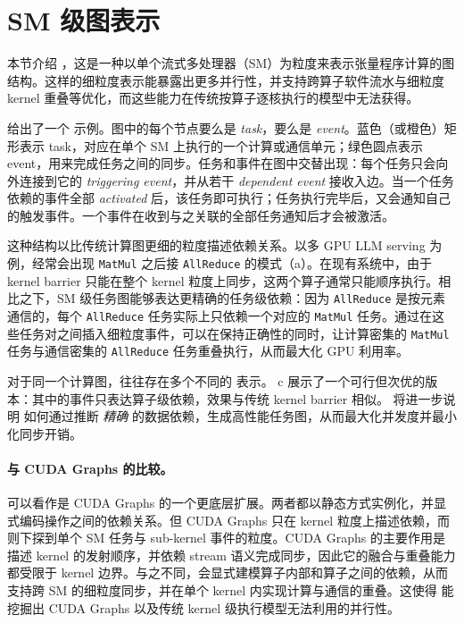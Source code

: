 \section{SM 级图表示}
\label{sec:task_graph}

本节介绍 {\em \graph}，这是一种以单个流式多处理器（SM）为粒度来表示张量程序计算的图结构。这样的细粒度表示能暴露出更多并行性，并支持跨算子软件流水与细粒度 kernel 重叠等优化，而这些能力在传统按算子逐核执行的模型中无法获得。

 给出了一个 \graph 示例。图中的每个节点要么是 {\em task}，要么是 {\em event}。蓝色（或橙色）矩形表示 task，对应在单个 SM 上执行的一个计算或通信单元；绿色圆点表示 event，用来完成任务之间的同步。任务和事件在图中交替出现：每个任务只会向外连接到它的 {\em triggering event}，并从若干 {\em dependent event} 接收入边。当一个任务依赖的事件全部 {\em activated} 后，该任务即可执行；任务执行完毕后，又会通知自己的触发事件。一个事件在收到与之关联的全部任务通知后才会被激活。

这种结构以比传统计算图更细的粒度描述依赖关系。以多 GPU LLM serving 为例，经常会出现 {\tt MatMul} 之后接 {\tt AllReduce} 的模式（a）。在现有系统中，由于 kernel barrier 只能在整个 kernel 粒度上同步，这两个算子通常只能顺序执行。相比之下，SM 级任务图能够表达更精确的任务级依赖：因为 {\tt AllReduce} 是按元素通信的，每个 {\tt AllReduce} 任务实际上只依赖一个对应的 {\tt MatMul} 任务。通过在这些任务对之间插入细粒度事件，\sys 可以在保持正确性的同时，让计算密集的 {\tt MatMul} 任务与通信密集的 {\tt AllReduce} 任务重叠执行，从而最大化 GPU 利用率。

对于同一个计算图，往往存在多个不同的 \graph 表示。 c 展示了一个可行但次优的版本：其中的事件只表达算子级依赖，效果与传统 kernel barrier 相似。  将进一步说明 \sys 如何通过推断 {\em 精确} 的数据依赖，生成高性能任务图，从而最大化并发度并最小化同步开销。

\paragraph{与 CUDA Graphs 的比较。}
\graphs 可以看作是 CUDA Graphs 的一个更底层扩展。两者都以静态方式实例化，并显式编码操作之间的依赖关系。但 CUDA Graphs 只在 kernel 粒度上描述依赖，而 \graphs 则下探到单个 SM 任务与 sub-kernel 事件的粒度。CUDA Graphs 的主要作用是描述 kernel 的发射顺序，并依赖 stream 语义完成同步，因此它的融合与重叠能力都受限于 kernel 边界。与之不同，\graphs 会显式建模算子内部和算子之间的依赖，从而支持跨 SM 的细粒度同步，并在单个 kernel 内实现计算与通信的重叠。这使得 \sys 能挖掘出 CUDA Graphs 以及传统 kernel 级执行模型无法利用的并行性。
